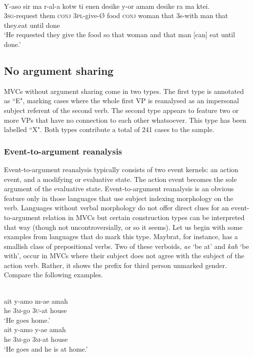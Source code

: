 \ea \label{selaru001o}
\\
\gll Y-aso sir ma r-al-a kotw ti enen desike y-or amam desike ra ma ktei. \\
3\textsc{sg}-request them \textsc{conj} 3\textsc{pl}-give-Ø food \textsc{conj} woman that 3s-with man that they.eat until done \\
\glft `He requested they give the food so that woman and that man [can] eat until done.'\\ 
\z

\subsection{No argument sharing}

MVCs without argument sharing come in two types. The first type is annotated as ``E", marking cases where the whole first VP is reanalysed as an impersonal subject referent of the second verb. The second type appears to feature two or more VPs that have no connection to each other whatsoever. This type has been labelled ``X". Both types contribute a total of 241 cases to the sample.

\subsubsection{Event-to-argument reanalysis}\label{sec:event-to-argument}

Event-to-argument reanalysis typically consists of two event kernels: an action event, and a modifying or evaluative state. The action event becomes the sole argument of the evaluative state. Event-to-argument reanalysis is an obvious feature only in those languages that use subject indexing morphology on the verb. Languages without verbal morphology do not offer direct clues for an event-to-argument relation in MVCs but certain construction types can be interpreted that way (though not uncontroversially, or so it seems). Let us begin with some examples from languages that do mark this type. Maybrat, for instance, has a smallish class of prepositional verbs. Two of these verboids, \textit{ae} `be at' and \textit{kah} `be with', occur in MVCs where their subject does not agree with the subject of the action verb. Rather, it shows the prefix for third person unmarked gender. Compare the following examples.

\ea \label{maybrat002}
\\
\ea
\gll ait y-amo m-ae amah \\
he 3\textsc{m}-go 3\textsc{u}-at house \\
\glft `He goes home.' \\ 
\ex
\gll ait y-amo y-ae amah \\ 
he 3\textsc{m}-go 3\textsc{m}-at house \\
\glft `He goes and he is at home.'\\ 
\z
\z


